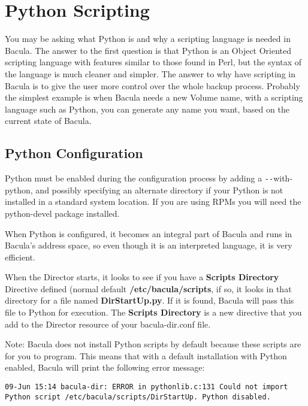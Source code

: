 
\chapter{Python Scripting}
\label{PythonChapter}

You may be asking what Python is and why a scripting language is
needed in Bacula. The answer to the first question is that Python
is an Object Oriented scripting language with features similar
to those found in Perl, but the syntax of the language is much
cleaner and simpler.  The answer to why have scripting in Bacula is to
give the user more control over the whole backup process. Probably 
the simplest example is when Bacula needs a new Volume name, with
a scripting language such as Python, you can generate any name 
you want, based on the current state of Bacula.

\section{Python Configuration}

Python must be enabled during the configuration process by adding
a \verb:--:with-python, and possibly specifying an alternate
directory if your Python is not installed in a standard system
location. If you are using RPMs you will need the python-devel package
installed.

When Python is configured, it becomes an integral part of Bacula and
runs in Bacula's address space, so even though it is an interpreted 
language, it is very efficient.

When the Director starts, it looks to see if you have a {\bf
Scripts Directory} Directive defined (normal default {\bf
/etc/bacula/scripts}, if so, it looks in that directory for a file named
{\bf DirStartUp.py}.  If it is found, Bacula will pass this file to Python
for execution.  The {\bf Scripts Directory} is a new directive that you add
to the Director resource of your bacula-dir.conf file.

Note: Bacula does not install Python scripts by default because these
scripts are for you to program.  This means that with a default
installation with Python enabled, Bacula will print the following error
message:

\begin{verbatim}
09-Jun 15:14 bacula-dir: ERROR in pythonlib.c:131 Could not import
Python script /etc/bacula/scripts/DirStartUp. Python disabled.
\end{verbatim}

